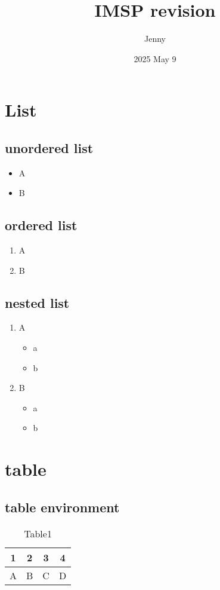 \documentclass{article}
\title{IMSP revision}
\author{Jenny}
\date{ 2025 May 9}
\begin{document}
\maketitle
\tableofcontents
\newpage

\section{List}
\subsection{unordered list}
\begin{itemize} 
\item A
\item B
\end{itemize}
\subsection{ ordered list}
\begin{enumerate}
\item A
\item B
\end{enumerate}
\subsection{nested list}
\begin{enumerate}
\item A
\begin{itemize} 
\item a
\item b
\end{itemize}
\item B
\begin{itemize} 
\item a
\item b
\end{itemize}
\end{enumerate}

\section{table}
\subsection{table environment}
\begin{table}[!h]%
\centering
\begin{tabular}{|c|c|c|c|} %
\hline
1&2&3&4\\
\hline
A&B&C&D\\
\hline
\end{tabular}
\caption{Table1}
\end{table}
\end{document}
